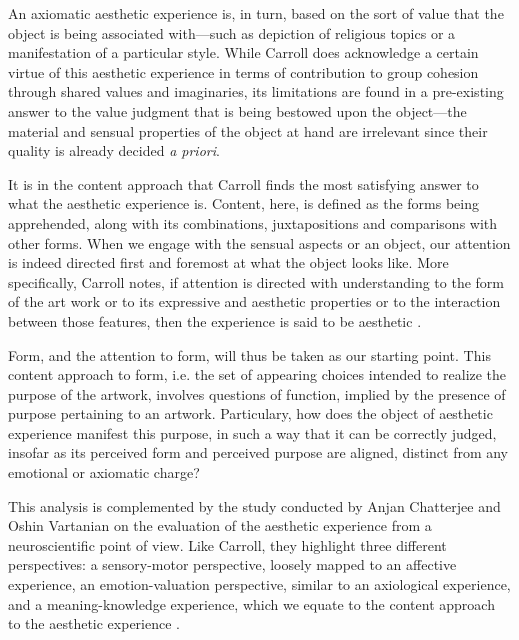 An axiomatic aesthetic experience is, in turn, based on the sort of value that the object is being associated with—such as depiction of religious topics or a manifestation of a particular style. While Carroll does acknowledge a certain virtue of this aesthetic experience in terms of contribution to group cohesion through shared values and imaginaries, its limitations are found in a pre-existing answer to the value judgment that is being bestowed upon the object—the material and sensual properties of the object at hand are irrelevant since their quality is already decided \emph{a priori}.

It is in the content approach that Carroll finds the most satisfying answer to what the aesthetic experience is. Content, here, is defined as the forms being apprehended, along with its combinations, juxtapositions and comparisons with other forms. When we engage with the sensual aspects or an object, our attention is indeed directed first and foremost at what the object looks like. More specifically, Carroll notes, if attention is directed with understanding to the form of the art work or to its expressive and aesthetic properties or to the interaction between those features, then the experience is said to be aesthetic \citep{carroll_aesthetic_2002}.

Form, and the attention to form, will thus be taken as our starting point.  This content approach to form, i.e. the set of appearing choices intended to realize the purpose of the artwork, involves questions of function, implied by the presence of purpose pertaining to an artwork. Particulary, how does the object of aesthetic experience manifest this purpose, in such a way that it can be correctly judged, insofar as its perceived form and perceived purpose are aligned, distinct from any emotional or axiomatic charge?

This analysis is complemented by the study conducted by Anjan Chatterjee and Oshin Vartanian on the evaluation of the aesthetic experience from a neuroscientific point of view. Like Carroll, they highlight three different perspectives: a sensory-motor perspective, loosely mapped to an affective experience, an emotion-valuation perspective, similar to an axiological experience, and a meaning-knowledge experience, which we equate to the content approach to the aesthetic experience \citep{chatterjee_neuroscience_2016}.

